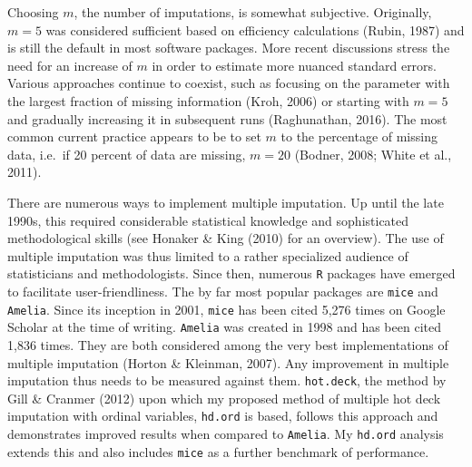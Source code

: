 \documentclass[12pt,econ]{sources/authesis}
\begin{document}
Choosing \(m\), the number of imputations, is somewhat subjective. Originally, \(m = 5\) was considered sufficient based on efficiency calculations (Rubin, 1987) and is still the default in most software packages. More recent discussions stress the need for an increase of \(m\) in order to estimate more nuanced standard errors. Various approaches continue to coexist, such as focusing on the parameter with the largest fraction of missing information (Kroh, 2006) or starting with \(m = 5\) and gradually increasing it in subsequent runs (Raghunathan, 2016). The most common current practice appears to be to set \(m\) to the percentage of missing data, i.e.~if 20 percent of data are missing, \(m = 20\) (Bodner, 2008; White et al., 2011).

There are numerous ways to implement multiple imputation. Up until the late 1990s, this required considerable statistical knowledge and sophisticated methodological skills (see Honaker \& King (2010) for an overview). The use of multiple imputation was thus limited to a rather specialized audience of statisticians and methodologists. Since then, numerous \texttt{R} packages have emerged to facilitate user-friendliness. The by far most popular packages are \texttt{mice} and \texttt{Amelia}. Since its inception in 2001, \texttt{mice} has been cited 5,276 times on Google Scholar at the time of writing. \texttt{Amelia} was created in 1998 and has been cited 1,836 times. They are both considered among the very best implementations of multiple imputation (Horton \& Kleinman, 2007). Any improvement in multiple imputation thus needs to be measured against them. \texttt{hot.deck}, the method by Gill \& Cranmer (2012) upon which my proposed method of multiple hot deck imputation with ordinal variables, \texttt{hd.ord} is based, follows this approach and demonstrates improved results when compared to \texttt{Amelia}. My \texttt{hd.ord} analysis extends this and also includes \texttt{mice} as a further benchmark of performance.
\end{document}
